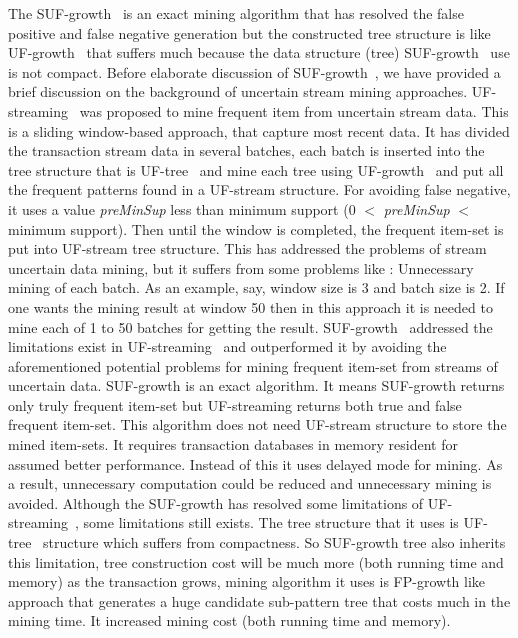 \documentclass[conference]{IEEEtran}
\begin{document}
The SUF-growth~\cite{DBLP:conf/icde/LeungH09} is an exact mining algorithm that has resolved the false positive and false negative generation but the constructed tree structure is like UF-growth~\cite{DBLP:conf/kdd/GadeWK04} that suffers much because the data structure (tree) SUF-growth~\cite{DBLP:conf/icde/LeungH09} use is not compact. Before elaborate discussion of SUF-growth~\cite{DBLP:conf/icde/LeungH09}, we have provided a brief discussion on the background of uncertain stream mining approaches.
UF-streaming~\cite{DBLP:conf/icde/LeungH09} was proposed to mine frequent item from uncertain stream data. This is a sliding window-based approach, that capture most recent data. It has divided the transaction stream data in several batches, each batch is inserted into the tree structure that is UF-tree~\cite{DBLP:conf/kdd/GadeWK04} and mine each tree using UF-growth~\cite{DBLP:conf/kdd/GadeWK04} and put all the frequent patterns found in a UF-stream structure. For avoiding false negative, it uses a value \emph{preMinSup} less than minimum support (0 $<$ \emph{preMinSup} $<$ minimum support). Then until the window is completed, the frequent item-set is put into UF-stream tree structure. This has addressed the problems of stream uncertain data mining, but it suffers from some problems like : Unnecessary mining of each batch. As an example, say, window size is 3 and batch size is 2. If one wants the mining result at window 50 then in this approach it is needed to mine each of 1 to 50 batches for getting the result.
SUF-growth~\cite{DBLP:conf/icde/LeungH09} addressed the limitations exist in UF-streaming~\cite{DBLP:conf/icde/LeungH09} and outperformed it by avoiding the aforementioned potential problems for mining frequent item-set from streams of uncertain data. SUF-growth is an exact algorithm. It means SUF-growth returns only truly frequent item-set but UF-streaming returns both true and false frequent item-set. This algorithm does not need UF-stream structure to store the mined item-sets. It requires transaction databases in memory resident for assumed better performance. Instead of this it uses delayed mode for mining. As a result, unnecessary computation could be reduced and unnecessary mining is avoided.
%
Although the SUF-growth has resolved some limitations of UF-streaming~\cite{DBLP:conf/icde/LeungH09}, some limitations still exists. The tree structure that it uses is UF-tree~\cite{DBLP:conf/kdd/GadeWK04} structure which suffers from compactness. So SUF-growth tree also inherits this limitation, tree construction cost will be much more (both running time and memory) as the transaction grows, mining algorithm it uses is FP-growth like approach that generates a huge candidate sub-pattern tree that costs much in the mining time. It increased mining cost (both running time and memory).
\end{document}
